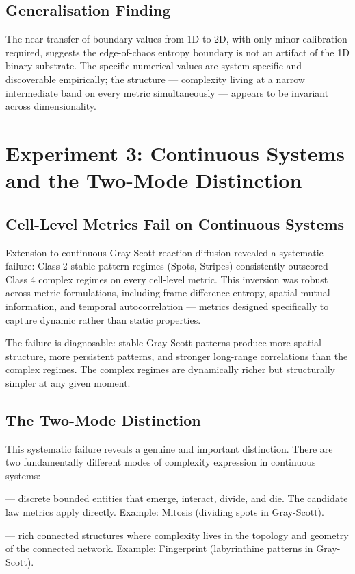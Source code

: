 \documentclass[12pt,a4paper]{article}
\begin{document}
\subsection{Generalisation Finding}

The near-transfer of boundary values from 1D to 2D, with only minor
calibration required, suggests the edge-of-chaos entropy boundary
is not an artifact of the 1D binary substrate.
The specific numerical values are system-specific and discoverable
empirically; the structure — complexity living at a narrow intermediate
band on every metric simultaneously — appears to be invariant across
dimensionality.

\section{Experiment 3: Continuous Systems and the Two-Mode Distinction}

\subsection{Cell-Level Metrics Fail on Continuous Systems}

Extension to continuous Gray-Scott reaction-diffusion \citep{gray1984}
revealed a systematic failure: Class 2 stable pattern regimes (Spots,
Stripes) consistently outscored Class 4 complex regimes on every
cell-level metric.
This inversion was robust across metric formulations, including
frame-difference entropy, spatial mutual information, and temporal
autocorrelation — metrics designed specifically to capture dynamic
rather than static properties.

The failure is diagnosable: stable Gray-Scott patterns produce more
spatial structure, more persistent patterns, and stronger long-range
correlations than the complex regimes.
The complex regimes are dynamically richer but structurally simpler at
any given moment.

\subsection{The Two-Mode Distinction}

This systematic failure reveals a genuine and important distinction.
There are two fundamentally different modes of complexity expression
in continuous systems:

\begin{description}[noitemsep, leftmargin=1.5em]
  \item[Object-based complexity] — discrete bounded entities that
    emerge, interact, divide, and die. The candidate law metrics apply
    directly. Example: Mitosis (dividing spots in Gray-Scott).
  \item[Morphological complexity] — rich connected structures where
    complexity lives in the topology and geometry of the connected
    network. Example: Fingerprint (labyrinthine patterns in Gray-Scott).
\end{description}
\end{document}
